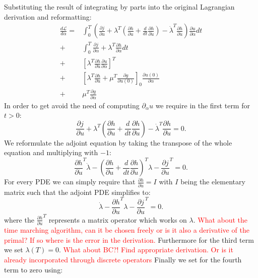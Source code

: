 \documentclass[10pt]{article}
\begin{document}
Substituting the result of integrating by parts into the original Lagrangian derivation and reformatting:
\begin{align}
\frac{d\mathcal{L}}{d \alpha} = 
&\int_{0}^{T}\left( \frac{\partial j}{\partial u} + \lambda^T \left(  \frac{\partial h}{\partial u} + \frac{d}{dt}\frac{\partial h}{\partial\dot u} \right) - \dot\lambda^T \frac{\partial h}{\partial\dot u} \right) \frac{\partial u}{\partial \alpha} dt \\
+&\int_{0}^{T}\frac{\partial j}{\partial \alpha} + \lambda^T \frac{\partial h}{\partial \alpha} dt \\
+& \left[ \lambda^T \frac{\partial h}{\partial\dot u} \frac{\partial u}{\partial \alpha} \right]^{T} \\
+& \left[ \lambda^T \frac{\partial h}{\partial\dot u} + \mu^T \frac{\partial g}{\partial u(0)} \right]_{0}  \frac{\partial u(0)}{\partial \alpha} \\
+& \mu^T\frac{\partial g}{\partial\alpha}
\end{align}
In order to get avoid the need of computing $\partial_{\alpha} u$ we require in the first term for $t>0$:
\begin{equation}
\frac{\partial j}{\partial u} + \lambda^T \left(  \frac{\partial h}{\partial u} + \frac{d}{dt}\frac{\partial h}{\partial\dot u} \right) - \dot\lambda^T \frac{\partial h}{\partial\dot u} = 0.
\end{equation}
We reformulate the adjoint equation by taking the transpose of the whole equation and multiplying with $-1$:
\begin{equation}
\frac{\partial h}{\partial\dot u}^T\dot\lambda - \left(\frac{\partial h}{\partial u} + \frac{d}{dt}\frac{\partial h}{\partial\dot u} \right)^T \lambda  - \frac{\partial j}{\partial u}^T  = 0.
\end{equation}
For every PDE we can simply require that $\frac{\partial h}{\partial\dot u} = I$ with $I$ being the elementary matrix such that the adjoint PDE simplifies to:
\begin{equation}
\dot\lambda - \frac{\partial h}{\partial u}^T \lambda  - \frac{\partial j}{\partial u}^T  = 0.
\end{equation}
where the $\frac{\partial h}{\partial u}^T$ represents a matrix operator which works on $\lambda$. \textcolor{red}{What about the time marching algorithm, can it be chosen freely or is it also a derivative of the primal? If so where is the error in the derivation.}
Furthermore for the third term we set $\lambda(T)=0$. \textcolor{red}{What about BC?! Find appropriate derivation. Or is it already incorporated through discrete operators} Finally we set for the fourth term to zero using:
\end{document}
